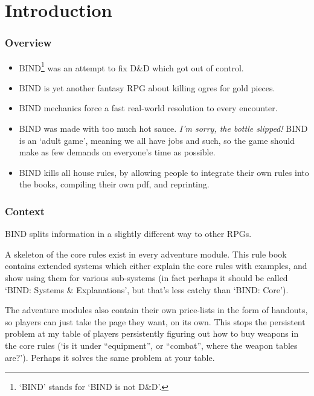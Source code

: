 \chapter*{Introduction}

\begin{multicols}{2}

\subsection*{Overview}

\begin{itemize}
  \item
  BIND\footnote{`BIND' stands for `BIND is not D\&D'.} was an attempt to fix D\&D which got out of control.
  \item
  BIND is yet another fantasy RPG about killing ogres for gold pieces.
  \item
  BIND mechanics force a fast real-world resolution to every encounter.
  \item
  \ifnum{}
    BIND was made with too much hot sauce.
    \emph{I'm sorry, the bottle slipped!}
  \else
  BIND is an `adult game', meaning we all have jobs and such, so the game should make as few demands on everyone's time as possible.
  \fi
  \item
  BIND kills all house rules, by allowing people to integrate their own rules into the books, compiling their own pdf, and reprinting.
\end{itemize}

\subsection*{Context}

BIND splits information in a slightly different way to other RPGs.

A skeleton of the core rules exist in every adventure module.
This rule book contains extended systems which either explain the core rules with examples, and show using them for various sub-systems (in fact perhaps it should be called `BIND: Systems \& Explanations', but that's less catchy than `BIND: Core').

The adventure modules also contain their own price-lists in the form of handouts, so players can just take the page they want, on its own.
This stops the persistent problem at my table of players persistently figuring out how to buy weapons in the core rules (`is it under ``equipment'', or ``combat'', where the weapon tables are?').
Perhaps it solves the same problem at your table.


\end{multicols}
